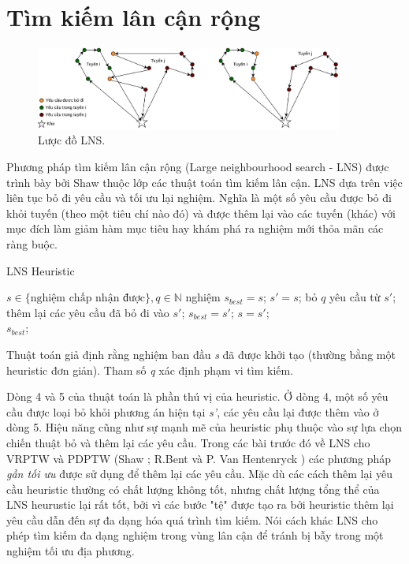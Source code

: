 \section{Tìm kiếm lân cận rộng}

\begin{figure}[H] %
  \centering %
  \includegraphics[width=0.9\textwidth]{figures/ALNS-paradim.png} 
  \caption{Lược đồ LNS.} 
  \label{fig:lns_paradim}
\end{figure}

Phương pháp tìm kiếm lân cận rộng (Large neighbourhood search - LNS) được trình bày bởi Shaw \cite{shaw1998using} thuộc lớp các thuật toán tìm kiếm lân cận. LNS dựa trên việc liên tục bỏ đi yêu cầu và tối ưu lại nghiệm. Nghĩa là một số yêu cầu được bỏ đi khỏi tuyến (theo một tiêu chí nào đó) và được thêm lại vào các tuyến (khác) với mục đích làm giảm hàm mục tiêu hay khám phá ra nghiệm mới thỏa mãn các ràng buộc.

\begin{algorithm}
  \label{alg:lns}
	\caption{LNS Heuristic} 
	\begin{algorithmic}[1]
        \Require $s \in \text{\{nghiệm chấp nhận được\}}, q \in \mathbb{N}$
        \State nghiệm $s_{best} = s$;
				\Repeat
					\State $s'=s$;
					\State bỏ $q$ yêu cầu từ $s'$;
					\State thêm lại các yêu cầu đã bỏ đi vào $s'$;
						\State $s_{best} = s'$;
					\EndIf
						\State $s=s'$;
					\EndIf
				\\
				\Return $s_{best}$;
	\end{algorithmic} 
\end{algorithm}

Thuật toán giả định rằng nghiệm ban đầu \textit{s} đã được khởi tạo (thường bằng một heuristic đơn giản). Tham số \textit{q} xác định phạm vi tìm kiếm. 

Dòng 4 và 5 của thuật toán là phần thú vị của heuristic. Ở dòng 4, một số yêu cầu được loại bỏ khỏi phương án hiện tại \textit{s'}, các yêu cầu lại được thêm vào ở dòng 5. Hiệu năng cũng như sự mạnh mẽ của heuristic phụ thuộc vào sự lựa chọn chiến thuật bỏ và thêm lại các yêu cầu. Trong các bài trước đó về LNS cho VRPTW và PDPTW (Shaw \cite{shaw1997new}; R.Bent và P. Van Hentenryck \cite{bent2003two}) các phương pháp \textit{gần tối ưu} được sử dụng để thêm lại các yêu cầu. Mặc dù các cách thêm lại yêu cầu heuristic thường có chất lượng không tốt, nhưng chất lượng tổng thể của LNS heurustic lại rất tốt, bởi vì các bước "tệ" được tạo ra bởi heuristic thêm lại yêu cầu dẫn đến sự đa dạng hóa quá trình tìm kiếm. Nói cách khác LNS cho phép tìm kiếm đa dạng nghiệm trong vùng lân cận để tránh bị bẫy trong một nghiệm tối ưu địa phương.


